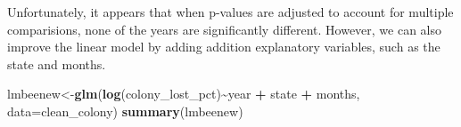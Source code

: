 \documentclass[
]{article}
\newenvironment{Shaded}{\begin{snugshade}}{\end{snugshade}}
\newcommand{\AttributeTok}[1]{\textcolor[rgb]{0.13,0.29,0.53}{#1}}
\newcommand{\FunctionTok}[1]{\textcolor[rgb]{0.13,0.29,0.53}{\textbf{#1}}}
\newcommand{\NormalTok}[1]{#1}
\newcommand{\OtherTok}[1]{\textcolor[rgb]{0.56,0.35,0.01}{#1}}
\newcommand{\SpecialCharTok}[1]{\textcolor[rgb]{0.81,0.36,0.00}{\textbf{#1}}}
\begin{document}
Unfortunately, it appears that when p-values are adjusted to account for
multiple comparisions, none of the years are significantly different.
However, we can also improve the linear model by adding addition
explanatory variables, such as the state and months.

\begin{Shaded}
\begin{Highlighting}[]
\NormalTok{lmbeenew}\OtherTok{\textless{}{-}}\FunctionTok{glm}\NormalTok{(}\FunctionTok{log}\NormalTok{(colony\_lost\_pct)}\SpecialCharTok{\textasciitilde{}}\NormalTok{year }\SpecialCharTok{+}\NormalTok{ state }\SpecialCharTok{+}\NormalTok{ months, }\AttributeTok{data=}\NormalTok{clean\_colony)}
\FunctionTok{summary}\NormalTok{(lmbeenew)}
\end{Highlighting}
\end{Shaded}
\end{document}
